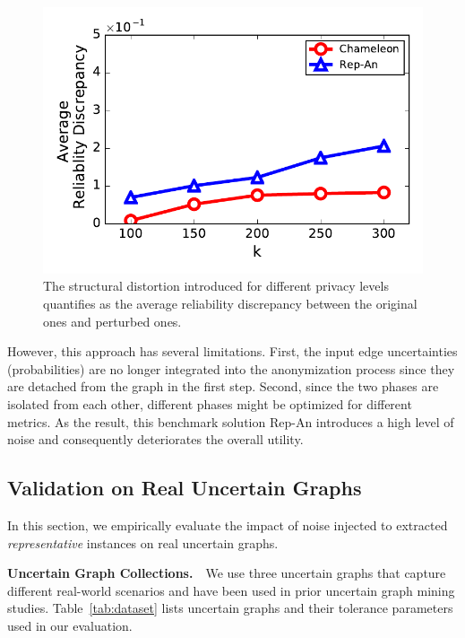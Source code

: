 \begin{figure}[!htb]
{\begin{minipage}[l]{0.62\columnwidth}
        \includegraphics[width=1\linewidth]{rep_exp/ppi_rel.pdf}
      \end{minipage}
      }

    \vspace{-10pt}
    \caption{The structural distortion introduced for different privacy levels quantifies as the average reliability discrepancy between the original ones and perturbed ones.}
    \label{fig:rep_exp}
    \vspace{-5pt}
\end{figure}

However, this approach has several limitations. First, the input edge uncertainties (probabilities) are no longer integrated into the anonymization process since they are detached from the graph in the first step. Second, since the two phases are isolated from each other, different phases might be optimized for different metrics.  As the result, this benchmark solution Rep-An introduces a high level of noise and consequently deteriorates the overall utility.

\subsection{Validation on Real Uncertain Graphs}
In this section, we empirically evaluate the impact of noise injected to extracted \emph{representative} instances on real uncertain graphs. 

\textbf{Uncertain Graph Collections.}~~We use three uncertain graphs that capture different real-world scenarios and have been used in prior uncertain graph mining studies. Table~\ref{tab:dataset} lists uncertain graphs and their tolerance parameters used in our evaluation.

